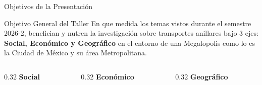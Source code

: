 \begin{frame}{Objetivos de la Presentación}
  \begin{block}{Objetivo General del Taller}
    En que medida los temas vistos durante el semestre 2026-2, benefician y nutren la investigación
    sobre transportes anillares bajo 3 ejes: \textbf{Social, Económico y Geográfico} en el entorno de una
    Megalopolis como lo es la Ciudad de México y su área Metropolitana.
  \end{block}
  \vspace{0.4cm}
  \begin{columns}[T]
    \begin{column}{0.32\textwidth}
      \centering
      {\color{ColorPrincipal}\Large\textbf{Social}}\\[0.1cm]
    \end{column}
    \begin{column}{0.32\textwidth}
      \centering
      {\color{ColorPrincipal}\Large\textbf{Económico}}\\[0.1cm]
    \end{column}
    \begin{column}{0.32\textwidth}
      \centering
      {\color{ColorPrincipal}\Large\textbf{Geográfico}}\\[0.1cm]
    \end{column}
  \end{columns}
\end{frame}
